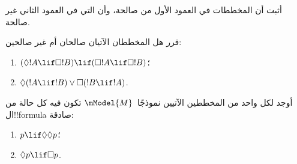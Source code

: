 \documentclass[../../../include/open-logic-section]{subfiles}
\begin{document}
\begin{prob}%
  أثبت أن المخططات في العمود الأول من
   صالحة، وأن التي في
  العمود الثاني غير صالحة.
\end{prob}

\begin{prob}
  قرر هل المخططان الآتيان صالحان أم غير صالحين:
  \begin{enumerate}
  \item $(\Diamond !A \lif \Box !B) \lif (\Box !A \lif \Box
    !B)$؛
  \item $\Diamond(!A \lif !B) \lor \Box(!B \lif !A)$.
  \end{enumerate}
\end{prob}

\begin{prob}
  أوجد لكل واحد من المخططين الآتيين نموذجًا~$\mModel{M}$ تكون فيه كل
  حالة من ال!!{formula} صادقة:
  \begin{enumerate}
  \item $p \lif \Diamond\Diamond p$؛
  \item $\Diamond p \lif \Box p$.
  \end{enumerate}
\end{prob}
\end{document}
